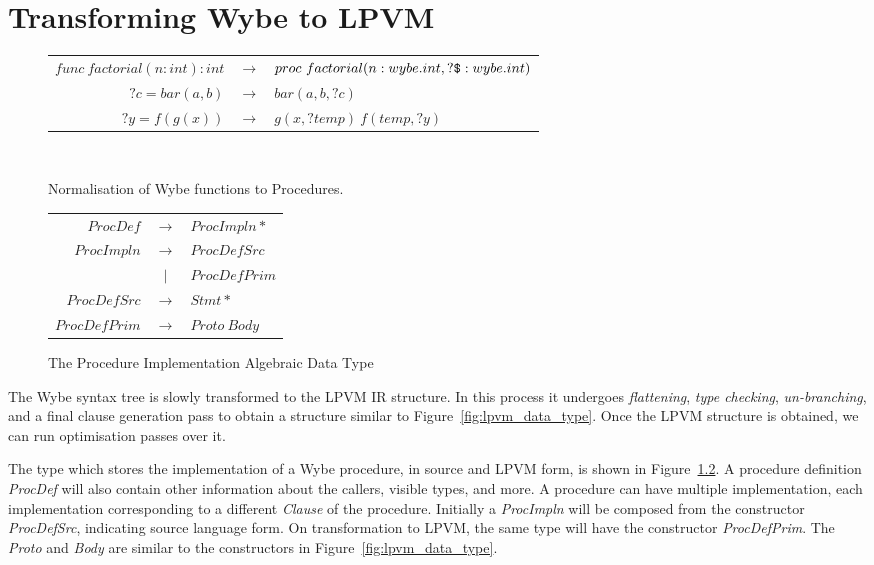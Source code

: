 \chapter{Transforming Wybe to LPVM}

\begin{figure}
  \centering
  \begin{tabular}{r c l}

    \( func\ factorial(n:int):int \) & \(\rightarrow \) & 
                                                          \( proc\ factorial(n:wybe.int, ?\verb+$+:wybe.int) \) \\
    \( ?c = bar(a, b) \) & \(\rightarrow\) & \( bar(a, b, ?c) \) \\
    \( ?y = f(g(x)) \) & \(\rightarrow\) & \( g(x, ?temp)\ f(temp, ?y) \) \\


  \end{tabular}
  \\
  \caption{Normalisation of Wybe functions to Procedures.}
  \label{fig:wybe_convert_to_proc}
\end{figure}



\begin{figure}
  \centering
  \begin{tabular}{r c l}
    \( ProcDef \)     & \( \rightarrow \) & \( ProcImpln* \)   \\
    \( ProcImpln \)   & \( \rightarrow \) & \( ProcDefSrc \)   \\
                      & \( \rvert \)        & \( ProcDefPrim \)  \\
    \( ProcDefSrc \)  & \( \rightarrow \) & \( Stmt* \)        \\
    \( ProcDefPrim \) & \( \rightarrow \) & \( Proto\ Body \)  \\
  \end{tabular}
  \caption{The Procedure Implementation Algebraic Data Type}
  \label{fig:proc_impln}
\end{figure}



The Wybe syntax tree is slowly transformed to the LPVM IR structure. In this
process it undergoes \textit{flattening}, \textit{type checking},
\textit{un-branching}, and a final clause generation pass to obtain a structure
similar to Figure~\ref{fig:lpvm_data_type}. Once the LPVM structure is
obtained, we can run optimisation passes over it.

The type which stores the implementation of a Wybe procedure, in source and
LPVM form, is shown in Figure~\ref{fig:proc_impln}. A procedure definition
\textit{ProcDef} will also contain other information about the callers, visible
types, and more. A procedure can have multiple implementation, each
implementation corresponding to a different \textit{Clause} of the
procedure. Initially a \textit{ProcImpln} will be composed from the constructor
\textit{ProcDefSrc}, indicating source language form. On transformation to
LPVM, the same type will have the constructor \textit{ProcDefPrim}. The
\textit{Proto} and \textit{Body} are similar to the constructors in
Figure~\ref{fig:lpvm_data_type}.


